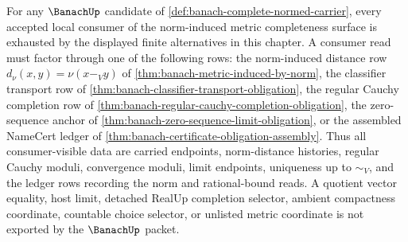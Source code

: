 \begin{theorem}
\label{thm:banach-norm-completeness-downstream-coverage}
For any $\BanachUp$ candidate of
\autoref{def:banach-complete-normed-carrier}, every accepted local consumer of
the norm-induced metric completeness surface is exhausted by the displayed
finite alternatives in this chapter. A consumer read must factor through one of
the following rows: the norm-induced distance row $d_\nu(x,y)=\nu(x-_V y)$ of
\autoref{thm:banach-metric-induced-by-norm}, the classifier transport row of
\autoref{thm:banach-classifier-transport-obligation}, the regular Cauchy
completion row of \autoref{thm:banach-regular-cauchy-completion-obligation},
the zero-sequence anchor of
\autoref{thm:banach-zero-sequence-limit-obligation}, or the assembled
NameCert ledger of \autoref{thm:banach-certificate-obligation-assembly}. Thus
all consumer-visible data are carried endpoints, norm-distance histories,
regular Cauchy moduli, convergence moduli, limit endpoints, uniqueness up to
$\sim_V$, and the ledger rows recording the norm and rational-bound reads. A
quotient vector equality, host limit, detached RealUp completion selector,
ambient compactness coordinate, countable choice selector, or unlisted metric
coordinate is not exported by the $\BanachUp$ packet.
\end{theorem}
